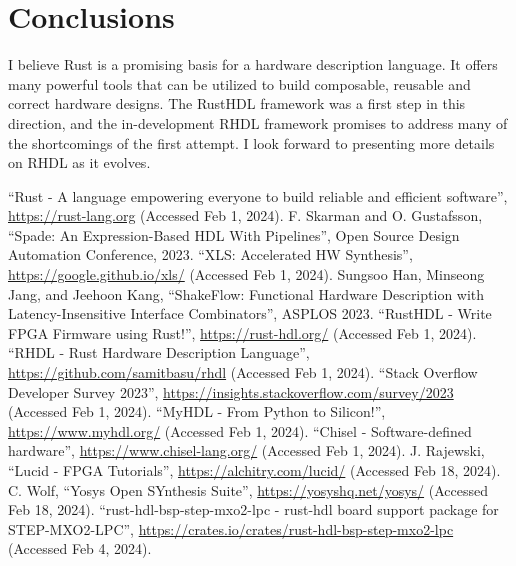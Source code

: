 \documentclass[sigplan,screen,sigconf]{acmart}
\begin{document}
\section{Conclusions}
I believe Rust is a promising basis for a hardware description language.  It offers many powerful tools
that can be utilized to build composable, reusable and correct hardware designs.  The RustHDL framework
was a first step in this direction, and the in-development RHDL framework promises to address many of the
shortcomings of the first attempt. I look forward to presenting more details on RHDL as it evolves.

\begin{thebibliography}{00}
   ``Rust - A language empowering everyone to build reliable and efficient software'', \url{https://rust-lang.org} (Accessed Feb 1, 2024).
   F. Skarman and O. Gustafsson, ``Spade: An Expression-Based HDL With Pipelines'', Open Source Design Automation Conference, 2023.
   ``XLS: Accelerated HW Synthesis'', \url{https://google.github.io/xls/} (Accessed Feb 1, 2024).
   Sungsoo Han, Minseong Jang, and Jeehoon Kang, ``ShakeFlow: Functional Hardware Description with Latency-Insensitive Interface Combinators'', ASPLOS 2023.
   ``RustHDL - Write FPGA Firmware using Rust!'', \url{https://rust-hdl.org/} (Accessed Feb 1, 2024).
   ``RHDL - Rust Hardware Description Language'', \url{https://github.com/samitbasu/rhdl} (Accessed Feb 1, 2024).
   ``Stack Overflow Developer Survey 2023'', \url{https://insights.stackoverflow.com/survey/2023} (Accessed Feb 1, 2024).
   ``MyHDL - From Python to Silicon!'', \url{https://www.myhdl.org/} (Accessed Feb 1, 2024).
   ``Chisel - Software-defined hardware'', \url{https://www.chisel-lang.org/} (Accessed Feb 1, 2024).
   J. Rajewski, ``Lucid - FPGA Tutorials'', \url{https://alchitry.com/lucid/} (Accessed Feb 18, 2024).
   C. Wolf, ``Yosys Open SYnthesis Suite'', \url{https://yosyshq.net/yosys/} (Accessed Feb 18, 2024).
   ``rust-hdl-bsp-step-mxo2-lpc - rust-hdl board support package for STEP-MXO2-LPC'', \url{https://crates.io/crates/rust-hdl-bsp-step-mxo2-lpc} (Accessed Feb 4, 2024).
\end{thebibliography}
\end{document}
